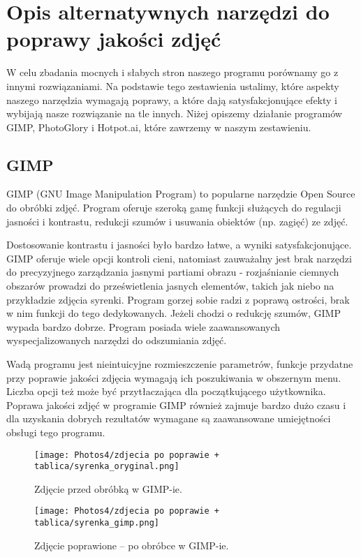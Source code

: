 \documentclass[]{mwart}
\begin{document}
\section{ Opis alternatywnych narzędzi do poprawy jakości zdjęć}
W celu zbadania mocnych i słabych stron naszego programu porównamy
go z innymi rozwiązaniami. Na podstawie tego zestawienia ustalimy,
które aspekty naszego narzędzia wymagają poprawy,
a które dają satysfakcjonujące efekty i wybijają nasze rozwiązanie na
tle innych. Niżej opiszemy działanie programów GIMP,
PhotoGlory i Hotpot.ai, które zawrzemy w naszym zestawieniu.

\subsection{GIMP}
GIMP (GNU Image Manipulation Program) to popularne narzędzie Open Source do obróbki zdjęć. Program oferuje szeroką gamę funkcji służących do regulacji jasności i kontrastu, redukcji szumów i usuwania obiektów (np. zagięć) ze zdjęć.

Dostosowanie kontrastu i jasności było bardzo łatwe, a wyniki satysfakcjonujące. GIMP oferuje wiele opcji kontroli cieni, natomiast zauważalny jest brak narzędzi do precyzyjnego zarządzania jasnymi partiami obrazu - rozjaśnianie ciemnych obszarów prowadzi do prześwietlenia jasnych elementów, takich jak niebo na przykładzie zdjęcia syrenki. Program gorzej sobie radzi z poprawą ostrości, brak w nim funkcji do tego dedykowanych.  Jeżeli chodzi o redukcję szumów, GIMP wypada bardzo dobrze. Program posiada wiele zaawansowanych wyspecjalizowanych narzędzi do odszumiania zdjęć.

Wadą programu jest nieintuicyjne rozmieszczenie parametrów, funkcje przydatne przy poprawie jakości zdjęcia wymagają ich poszukiwania w obszernym menu. Liczba opcji też może być przytłaczająca dla początkującego użytkownika. Poprawa jakości zdjęć w programie GIMP również zajmuje bardzo dużo czasu i dla uzyskania dobrych rezultatów wymagane są zaawansowane umiejętności obsługi tego programu.

\begin{figure}[H]
    \centering
    \texttt{[image: Photos4/zdjecia po poprawie + tablica/syrenka\_oryginal.png]}
    \caption{Zdjęcie przed obróbką w GIMP-ie.}
\end{figure}
\begin{figure}[H]
    \centering
    \texttt{[image: Photos4/zdjecia po poprawie + tablica/syrenka\_gimp.png]}
    \caption{Zdjęcie poprawione -- po obróbce w GIMP-ie.}
\end{figure}
\end{document}
